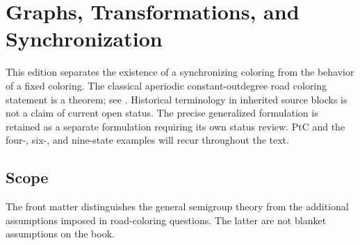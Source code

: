 \chapter{Graphs, Transformations, and Synchronization}
\label{organized:orientation}
\label{chapterone}
This edition separates the existence of a synchronizing coloring from the
behavior of a fixed coloring. The classical aperiodic constant-outdegree
road coloring statement is a theorem; see \cite{Trahtman2009}. Historical
terminology in inherited source blocks is not a claim of current open status.
The precise generalized formulation is retained as a separate formulation
requiring its own status review. PtC and the four-, six-, and nine-state
examples will recur throughout the text.

\section*{Scope}
The front matter distinguishes the general semigroup theory from the additional assumptions imposed in road-coloring questions. The latter are not blanket assumptions on the book.


